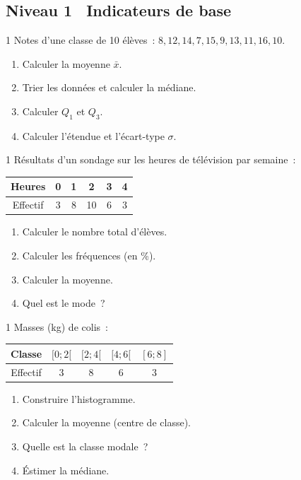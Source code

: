 \subsection*{\quad Niveau 1 \textemdash\ Indicateurs de base}

\begin{exo}{1}
Notes d'une classe de 10 \'el\`eves~:
$8, 12, 14, 7, 15, 9, 13, 11, 16, 10$.
\begin{enumerate}
  \item Calculer la moyenne $\bar{x}$.
  \item Trier les donn\'ees et calculer la m\'ediane.
  \item Calculer $Q_1$ et $Q_3$.
  \item Calculer l'\'etendue et l'\'ecart-type $\sigma$.
\end{enumerate}
\end{exo}

\begin{exo}{1}
R\'esultats d'un sondage sur les heures de t\'el\'evision par semaine~:
\begin{center}
\begin{tabular}{|c|ccccc|}
\hline
\rowcolor{BN!10}
Heures & 0 & 1 & 2 & 3 & 4 \\
\hline
Effectif & 3 & 8 & 10 & 6 & 3 \\
\hline
\end{tabular}
\end{center}
\begin{enumerate}
  \item Calculer le nombre total d'\'el\`eves.
  \item Calculer les fr\'equences (en \%).
  \item Calculer la moyenne.
  \item Quel est le mode~?
\end{enumerate}
\end{exo}

\begin{exo}{1}
Masses (kg) de colis~:
\begin{center}
\begin{tabular}{|c|c|c|c|c|}
\hline
\rowcolor{BN!10}
Classe & $[0;2[$ & $[2;4[$ & $[4;6[$ & $[6;8]$ \\
\hline
Effectif & 3 & 8 & 6 & 3 \\
\hline
\end{tabular}
\end{center}
\begin{enumerate}
  \item Construire l'histogramme.
  \item Calculer la moyenne (centre de classe).
  \item Quelle est la classe modale~?
  \item \'Estimer la m\'ediane.
\end{enumerate}
\end{exo}

